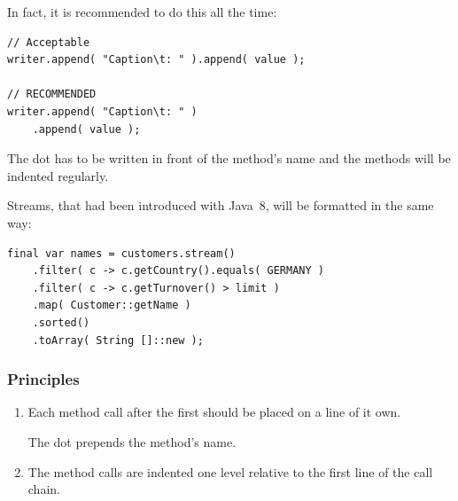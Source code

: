 In fact, it is recommended to do this all the time:
\begin{lstlisting}
// Acceptable
writer.append( "Caption\t: " ).append( value );

// RECOMMENDED
writer.append( "Caption\t: " )
    .append( value );
\end{lstlisting}

The dot has to be written in front of the method's name and the methods will be indented regularly.

Streams, that had been introduced with Java~8, will be formatted in the same way:
\begin{lstlisting}
final var names = customers.stream()
    .filter( c -> c.getCountry().equals( GERMANY )
    .filter( c -> c.getTurnover() > limit )
    .map( Customer::getName )
    .sorted()
    .toArray( String []::new );
\end{lstlisting}


\subsubsection{Principles}
\begin{enumerate}[label=P\arabic*.]
\item{Each method call after the first should be placed on a line of it own.

The dot prepends the method's name.}
\item{The method calls are indented one level relative to the first line of the call chain.} 
\end{enumerate}

